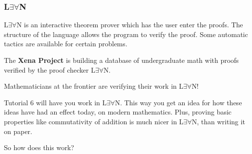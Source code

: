\documentclass{beamer}
\begin{document}
\begin{frame}
	\frametitle{L$\exists\forall$N }
	
	L$\exists\forall$N is an interactive theorem prover which has the user enter the proofs. The structure of the language allows the program to verify the proof. Some automatic tactics are available for certain problems. 
	
	\vspace{0.2cm}
	
	The \textbf{Xena Project} is building a database of undergraduate math with proofs verified by the proof checker L$\exists \forall$N. 
	
	\vspace{0.2cm}
	
	Mathematicians at the frontier are verifying their work in L$\exists\forall$N! 
	
	\vspace{0.2cm}
	
	Tutorial 6 will have you work in L$\exists\forall$N. This way you get an idea for how these ideas have had an effect today, on modern mathematics. Plus, proving basic properties like commutativity of addition is much nicer in L$\exists \forall$N, than writing it on paper.
	
	\vspace{0.2cm}
	
	So how does this work? 
	
\end{frame}
\end{document}
